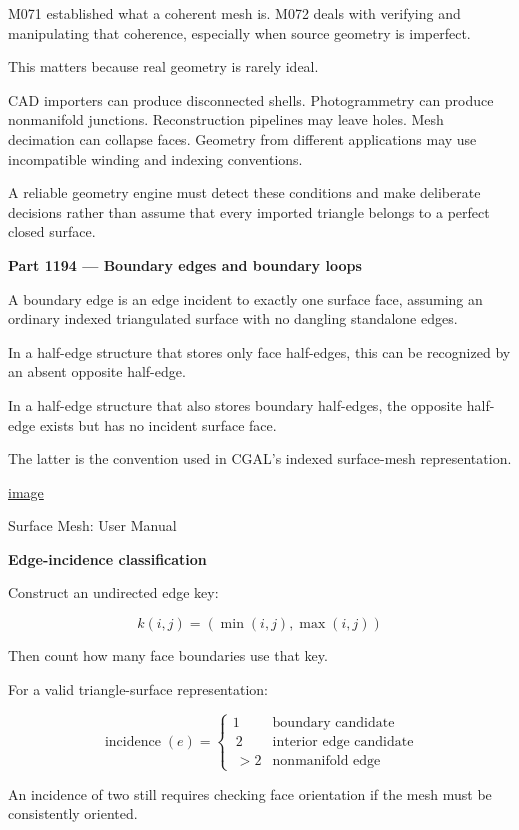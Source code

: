 M071 established what a coherent mesh is. M072 deals with verifying and manipulating that coherence, especially when source geometry is imperfect.

This matters because real geometry is rarely ideal.

CAD importers can produce disconnected shells. Photogrammetry can produce nonmanifold junctions. Reconstruction pipelines may leave holes. Mesh decimation can collapse faces. Geometry from different applications may use incompatible winding and indexing conventions.

A reliable geometry engine must detect these conditions and make deliberate decisions rather than assume that every imported triangle belongs to a perfect closed surface.

\textbf{Part 1194 --- Boundary edges and boundary loops}

A boundary edge is an edge incident to exactly one surface face, assuming an ordinary indexed triangulated surface with no dangling standalone edges.

In a half-edge structure that stores only face half-edges, this can be recognized by an absent opposite half-edge.

In a half-edge structure that also stores boundary half-edges, the opposite half-edge exists but has no incident surface face.

The latter is the convention used in CGAL's indexed surface-mesh representation. 

\href{https://www.google.com/s2/favicons?domain=https://doc.cgal.org&sz=32}{image}

Surface Mesh: User Manual

\textbf{Edge-incidence classification}

Construct an undirected edge key:

\[
k(i,j)=(\min(i,j),\max(i,j))
\]

Then count how many face boundaries use that key.

For a valid triangle-surface representation:

\[
\operatorname{incidence}(e)= \begin{cases} 1 & \text{boundary candidate}\\\ 2 & \text{interior edge candidate}\\\ >2 & \text{nonmanifold edge} \end{cases}
\]

An incidence of two still requires checking face orientation if the mesh must be consistently oriented.

